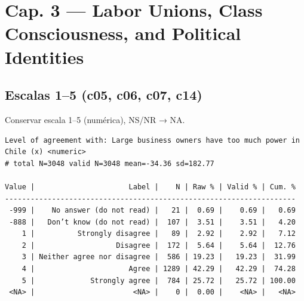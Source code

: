 \documentclass[
  letterpaper,
  DIV=11,
  numbers=noendperiod]{scrreprt}
\newenvironment{Shaded}{\begin{snugshade}}{\end{snugshade}}
\newcommand{\FunctionTok}[1]{\textcolor[rgb]{0.28,0.35,0.67}{#1}}
\newcommand{\NormalTok}[1]{\textcolor[rgb]{0.00,0.23,0.31}{#1}}
\newcommand{\SpecialCharTok}[1]{\textcolor[rgb]{0.37,0.37,0.37}{#1}}
\begin{document}
\section{Cap. 3 --- Labor Unions, Class Consciousness, and Political
Identities}\label{cap.-3-labor-unions-class-consciousness-and-political-identities}

\subsection{Escalas 1--5 (c05, c06, c07,
c14)}\label{escalas-15-c05-c06-c07-c14}

Conservar escala 1--5 (numérica), NS/NR → NA.

\begin{Shaded}
\end{Shaded}

\begin{verbatim}
Level of agreement with: Large business owners have too much power in Chile (x) <numeric> 
# total N=3048 valid N=3048 mean=-34.36 sd=182.77

Value |                      Label |    N | Raw % | Valid % | Cum. %
--------------------------------------------------------------------
 -999 |    No answer (do not read) |   21 |  0.69 |    0.69 |   0.69
 -888 |   Don’t know (do not read) |  107 |  3.51 |    3.51 |   4.20
    1 |          Strongly disagree |   89 |  2.92 |    2.92 |   7.12
    2 |                   Disagree |  172 |  5.64 |    5.64 |  12.76
    3 | Neither agree nor disagree |  586 | 19.23 |   19.23 |  31.99
    4 |                      Agree | 1289 | 42.29 |   42.29 |  74.28
    5 |             Strongly agree |  784 | 25.72 |   25.72 | 100.00
 <NA> |                       <NA> |    0 |  0.00 |    <NA> |   <NA>
\end{verbatim}
\end{document}

